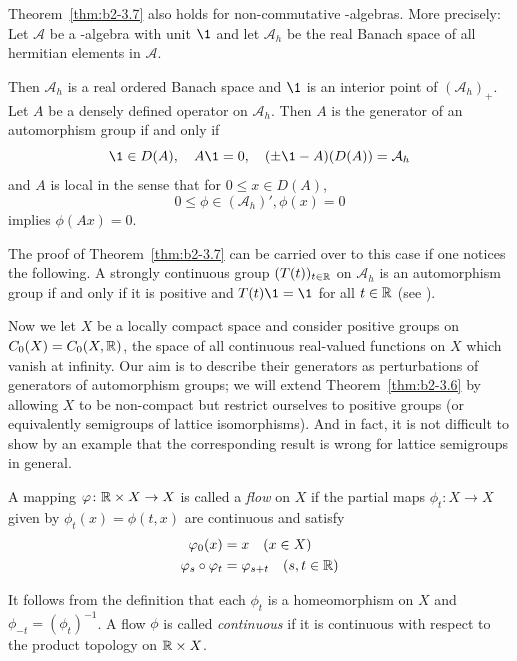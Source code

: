 \begin{remark*}\label{rem:b2-3.7b}
Theorem~\ref{thm:b2-3.7} also holds for non-com\-mutative \CA-algebras.
More precisely: Let $\mathcal{A}$ be a \CA-algebra with unit $\1$ and let $\mathcal{A}_{h}$ be the real Banach space of all hermitian elements in $\mathcal{A}$.

Then $\mathcal{A}_{h}$ is a real ordered Banach space and $\1$ is an interior point of\/ $(\mathcal{A}_{h})_{+}$.
Let $A$ be a densely defined operator on $\mathcal{A}_{h}$.
Then $A$ is the generator of an automorphism group if and only if\/ 
\[
    \1 \in D(A), \quad A\1 = 0, \quad
    (\pm\1 - A)(D(A)) = \mathcal{A}_{h}
\]
and $A$ is local in the sense that for $0 \leq x \in D(A)$,
%
\[
	0 \leq \phi \in (\mathcal{A}_{h})', \phi(x) = 0
\]
%
implies $\phi(Ax) = 0$.

The proof of Theorem~\ref{thm:b2-3.7} can be carried over to this case if one notices the following.
A strongly continuous group $(T(t))_{t \in \mathbb{R}}$ on $\mathcal{A}_{h}$ is an automorphism group if and only if it is positive and $T(t)\1 = \1$ for all $t \in \mathbb{R}$ (see \textcite[Corollary 3.2.21]{brattelirobinson:1979}).
\end{remark*}
Now we let $X$ be a locally compact space and consider positive groups on $C_{0}(X) = C_{0}(X,\mathbb{R})$, the space of all continuous real-valued functions on $X$ which vanish at infinity.
Our aim is to describe their generators as perturbations of generators of automorphism groups; \ie  we will extend Theorem~\ref{thm:b2-3.6} by allowing $X$ to be non-compact but
restrict ourselves to positive groups (or equivalently semigroups of lattice isomorphisms).
And in fact, it is not difficult to show by an example that the corresponding result is wrong for lattice semigroups in general.

A mapping $\phi \colon \R \times X \to X$ is called a \emph{flow} on $X$ if the partial maps $\phi_{t} \colon X \to X$ given by $\phi_{t}(x) = \phi(t,x)$ are continuous and satisfy
\begin{align}
\phi_{0}(x) &= x \quad (x \in X) \label{eq:b2-3.8} \\
\phi_{s} \circ \phi_{t} &= \phi_{s+t} \quad (s,t \in \R) \label{eq:b2-3.9}
\end{align}

It follows from the definition that each $\phi_{t}$ is a homeomorphism on $X$ and 
$\phi_{-t}=(\phi_{t})^{-1}$. 
A flow $\phi$ is called \emph{continuous} if it is continuous with respect to the product topology on $\mathbb{R} \times X$.

